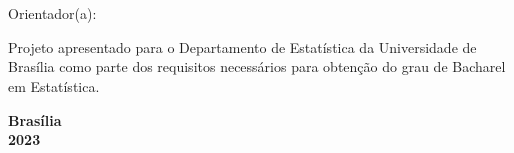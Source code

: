 \thispagestyle{empty}

\begin{center}
\textbf{\autor} \\
\vspace{5cm}
\textbf{\titulo} \\
\vspace{3cm}
\small
Orientador(a): \orientador \\
\end{center}


\vspace*{3cm}

\begin{flushright}
\begin{minipage}{7.5cm}
 \parbox[t]{7.5cm}{Projeto apresentado para o Departamento de Estatística da Universidade de Brasília como parte dos requisitos necessários para obtenção do grau de Bacharel em Estatística.}
\end{minipage}
\end{flushright}

\vspace{5cm}

\begin{center}
{\bf{Brasília} \\ }
\bf{2023}
\end{center}
